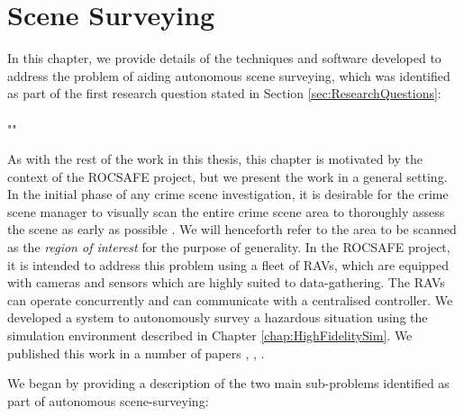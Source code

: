 \chapter{Scene Surveying}\label{chapter:SceneSurveying}
In this chapter, we provide details of the techniques and software developed to address the problem of aiding autonomous scene surveying, which was identified as part of the first research question stated in Section \ref{sec:ResearchQuestions}: 
\\
\\
"\textit{}"
\\
\par As with the rest of the work in this thesis, this chapter is motivated by the context of the ROCSAFE project, but we present the work in a general setting. In the initial phase of any crime scene investigation, it is desirable for the crime scene manager to visually scan the entire crime scene area to thoroughly assess the scene as early as possible \cite{TechnicalWorkingGrouponCrimeSceneInvestigation2013CrimeEnforcement}. We will henceforth refer to the area to be scanned as the \textit{region of interest} for the purpose of generality. In the ROCSAFE project, it is intended to address this problem using a fleet of RAVs, which are equipped with cameras and sensors which are highly suited to data-gathering. The RAVs can operate concurrently and can communicate with a centralised controller. We developed a system to autonomously survey a hazardous situation using the simulation environment described in Chapter \ref{chap:HighFidelitySim}. We published this work in a number of papers \cite{Smyth2018AInvestigation}, \cite{Smyth2018ASupport}, \cite{Smyth2018UsingDrones}.
\par We began by providing a description of the two main sub-problems identified as part of autonomous scene-surveying:
